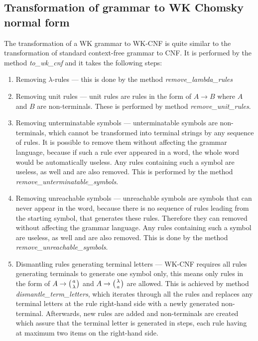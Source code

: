 \subsection{Transformation of grammar to WK Chomsky normal form}
The transformation of a WK grammar to WK-CNF is quite similar to the transformation of standard context-free grammar to CNF. It is performed by the method \textit{to\_wk\_cnf} and it takes the following steps:

\begin{enumerate}
  \item{Removing $\lambda$-rules --- this is done by the method \textit{remove\_lambda\_rules}}

  \item{Removing unit rules --- unit rules are rules in the form of $A \rightarrow B$ where $A$ and $B$ are non-terminals. These is performed by method \textit{remove\_unit\_rules}.}

  \item{Removing unterminatable symbols --- unterminatable symbols are non-terminals, which cannot be transformed into terminal strings by any sequence of rules. It is possible to remove them without affecting the grammar language, because if such a rule ever appeared in a word, the whole word would be automatically useless. Any rules containing such a symbol are useless, as well and are also removed. This is performed by the method \textit{remove\_unterminatable\_symbols}.}

  \item{Removing unreachable symbols --- unreachable symbols are symbols that can never appear in the word, because there is no sequence of rules leading from the starting symbol, that generates these rules. Therefore they can removed without affecting the grammar language. Any rules containing such a symbol are useless, as well and are also removed. This is done by the method \textit{remove\_unreachable\_symbols}.}

  \item{Dismantling rules generating terminal letters --- WK-CNF requires all rules generating terminals to generate one symbol only, this means only rules in the form of $A \rightarrow \wkpair{a}{\lambda}$ and $A \rightarrow \wkpair{\lambda}{a}$ are allowed. This is achieved by method \textit{dismantle\_term\_letters}, which iterates through all the rules and replaces any terminal letters at the rule right-hand side with a newly generated non-terminal. Afterwards, new rules are added and non-terminals are created which assure that the terminal letter is generated in steps, each rule having at maximum two items on the right-hand side.

}
\end{enumerate}
